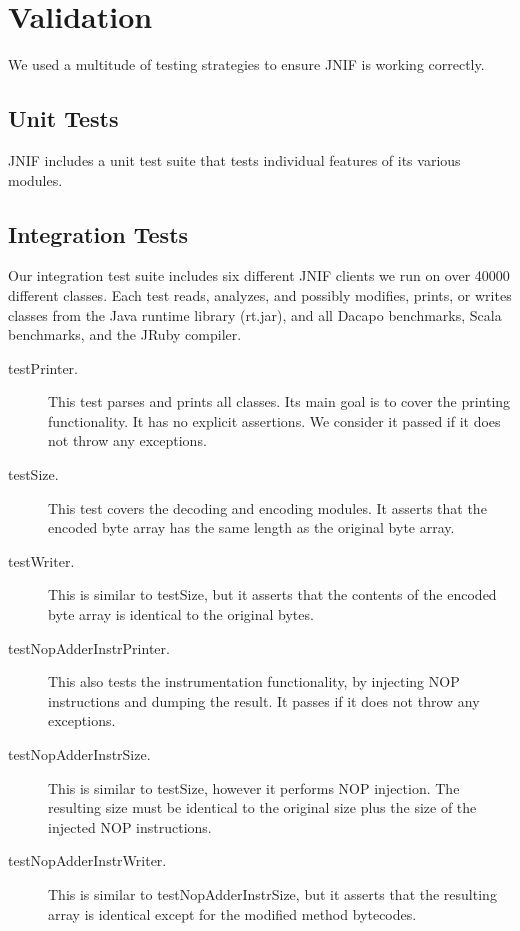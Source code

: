 \section{Validation}
\label{sec:jnif-test}

We used a multitude of testing strategies to ensure JNIF is working correctly.


\subsection*{Unit Tests}

JNIF includes a unit test suite that tests individual features of its various modules.

\subsection*{Integration Tests}

Our integration test suite includes six different JNIF clients we run on over 40000 different classes.
Each test reads, analyzes, and possibly modifies, prints, or writes classes from the Java runtime library (rt.jar),
and all Dacapo benchmarks, Scala benchmarks, and the JRuby compiler.

\begin{description}
	\item[testPrinter.] This test parses and prints all classes. Its main goal is to cover the printing functionality. It has no explicit assertions. We consider it passed if it does not throw any exceptions.
	\item[testSize.] This test covers the decoding and encoding modules. It asserts that the encoded byte array has the same length as the original byte array.
	\item[testWriter.] This is similar to testSize, but it asserts that the contents of the encoded byte array is identical to the original bytes.
	\item[testNopAdderInstrPrinter.] This also tests the instrumentation functionality, by injecting NOP instructions and dumping the result. It passes if it does not throw any exceptions.
	\item[testNopAdderInstrSize.] This is similar to testSize, however it performs NOP injection. The resulting size must be identical to the original size plus the size of the injected NOP instructions.
	\item[testNopAdderInstrWriter.] This is similar to testNopAdderInstrSize, but it asserts that the resulting array is identical except for the modified method bytecodes.
\end{description}

